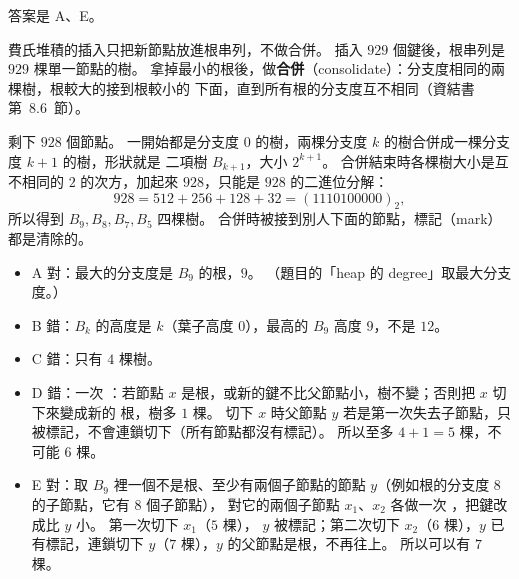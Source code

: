 \begin{pastsoln}
答案是 A、E。

費氏堆積的插入只把新節點放進根串列，不做合併。 插入 $929$ 個鍵後，根串列是 $929$ 棵單一節點的樹。
 拿掉最小的根後，做\textbf{合併}（consolidate）：分支度相同的兩棵樹，根較大的接到根較小的
下面，直到所有根的分支度互不相同（資結書第~8.6~節）。

剩下 $928$ 個節點。 一開始都是分支度 $0$ 的樹，兩棵分支度 $k$ 的樹合併成一棵分支度 $k + 1$ 的樹，形狀就是
二項樹 $B_{k+1}$，大小 $2^{k+1}$。 合併結束時各棵樹大小是互不相同的 $2$ 的次方，加起來 $928$，只能是
$928$ 的二進位分解：
\[
928 = 512 + 256 + 128 + 32 = (1110100000)_2,
\]
所以得到 $B_9, B_8, B_7, B_5$ 四棵樹。 合併時被接到別人下面的節點，標記（mark）都是清除的。
\begin{itemize}
\item A 對：最大的分支度是 $B_9$ 的根，$9$。 （題目的「heap 的 degree」取最大分支度。）
\item B 錯：$B_k$ 的高度是 $k$（葉子高度 $0$），最高的 $B_9$ 高度 $9$，不是 $12$。
\item C 錯：只有 $4$ 棵樹。
\item D 錯：一次 ：若節點 $x$ 是根，或新的鍵不比父節點小，樹不變；否則把 $x$ 切下來變成新的
根，樹多 $1$ 棵。 切下 $x$ 時父節點 $y$ 若是第一次失去子節點，只被標記，不會連鎖切下（所有節點都沒有標記）。
所以至多 $4 + 1 = 5$ 棵，不可能 $6$ 棵。
\item E 對：取 $B_9$ 裡一個不是根、至少有兩個子節點的節點 $y$（例如根的分支度 $8$ 的子節點，它有 $8$ 個子節點），
對它的兩個子節點 $x_1$、$x_2$ 各做一次 ，把鍵改成比 $y$ 小。 第一次切下 $x_1$（$5$ 棵），
$y$ 被標記；第二次切下 $x_2$（$6$ 棵），$y$ 已有標記，連鎖切下 $y$（$7$ 棵），$y$ 的父節點是根，不再往上。
所以可以有 $7$ 棵。
\end{itemize}
\end{pastsoln}
